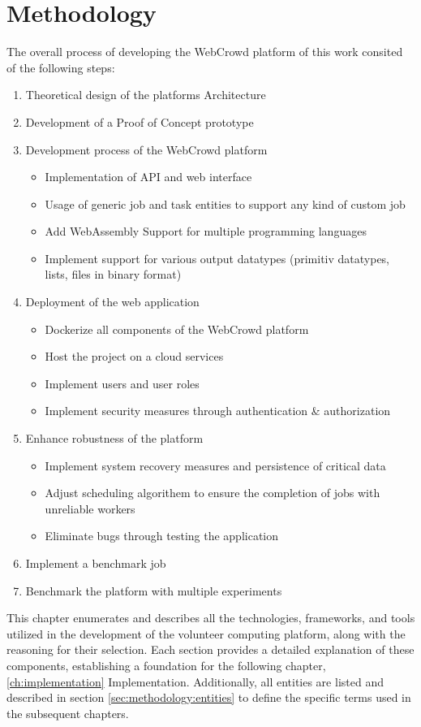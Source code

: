 \chapter{Methodology}
\label{ch:methodology}
The overall process of developing the WebCrowd platform of this work consited of the following steps:
\begin{enumerate}
  \item Theoretical design of the platforms Architecture
  \item Development of a Proof of Concept prototype
  \item Development process of the WebCrowd platform
  \begin{itemize}
    \item Implementation of \acs{API} and web interface
    \item Usage of generic job and task entities to support any kind of custom job
    \item Add WebAssembly Support for multiple programming languages
    \item Implement support for various output datatypes (primitiv datatypes, lists, files in binary format)
  \end{itemize}
  \item Deployment of the web application
  \begin{itemize}
    \item Dockerize all components of the WebCrowd platform
    \item Host the project on a cloud services
    \item Implement users and user roles
    \item Implement security measures through authentication \& authorization
  \end{itemize}
  \item Enhance robustness of the platform
  \begin{itemize}
    \item Implement system recovery measures and persistence of critical data
    \item Adjust scheduling algorithem to ensure the completion of jobs with unreliable workers
    \item Eliminate bugs through testing the application
  \end{itemize}
  \item Implement a benchmark job
  \item Benchmark the platform with multiple experiments 
\end{enumerate}
This chapter enumerates and describes all the technologies, frameworks, and tools utilized in the development of the volunteer computing platform, along with the reasoning for their selection. Each section provides a detailed explanation of these components, establishing a foundation for the following chapter, \ref{ch:implementation} Implementation. Additionally, all entities are listed and described in section \ref{sec:methodology:entities} to define the specific terms used in the subsequent chapters.

